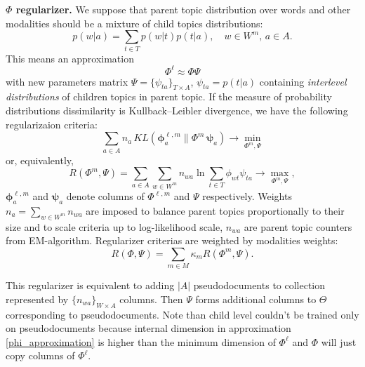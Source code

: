 \documentclass[12pt, twoside]{article}
\begin{document}
\textbf{$\Phi$ regularizer.}
We suppose that parent topic distribution over words and other modalities should be a mixture of child topics distributions:
\[
p(w|a) = \sum_{t \in T} p(w|t) p(t|a), \quad w \in W^m, \, a \in A.
\] 
This means an approximation 
\begin{equation}
\label{phi_approximation}
\Phi^\ell \approx \Phi \Psi
\end{equation}
 with new parameters matrix $\Psi = \{\psi_{ta}\}_{T \times A}$, $\psi_{ta} = p(t|a)$ containing \emph{interlevel distributions} of children topics in parent topic. If the measure of probability distributions dissimilarity is Kullback–Leibler divergence, we have the following regularizaion criteria:
\begin{equation}
\label{phi_regularizer}
\nonumber
 \sum_{a \in A} n_a \, KL(\bm \phi^{\ell, m}_a \| \Phi^m \, \bm \psi_a)  \rightarrow \min_{\Phi^m, \Psi}
\end{equation}
or, equivalently,
\[
R(\Phi^m, \Psi) = \sum_{a \in A} \sum_{w \in W^m} n_{wa} \ln \sum_{t \in T} \phi_{wt} \psi_{ta} \rightarrow \max_{\Phi^m, \Psi},
\]
$\bm \phi^{\ell, m}_a$ and $\bm \psi_a$ denote columns of $\Phi^{\ell, m}$ and $\Psi$ respectively. Weights $n_a = \sum_{w \in W^m} n_{wa}$ are imposed to balance parent topics proportionally to their size and to scale criteria up to log-likelihood scale, $n_{wa}$ are parent topic counters from EM-algorithm.
Regularizer criterias are weighted by modalities weights: 
\[
R(\Phi, \Psi) = \sum_{m \in M} \kappa_m R(\Phi^m, \Psi).
\]

This regularizer is equivalent to adding $|A|$ pseudodocuments to collection represented by $\{n_{wa}\}_{W \times A}$ columns. Then $\Psi$ forms additional columns to $\Theta$ corresponding to pseudodocuments. Note than child level couldn't be trained only on pseudodocuments because internal dimension in approximation \eqref{phi_approximation} is higher than the minimum dimension of $\Phi^\ell$ and $\Phi$ will just copy columns of $\Phi^\ell$.
\end{document}
